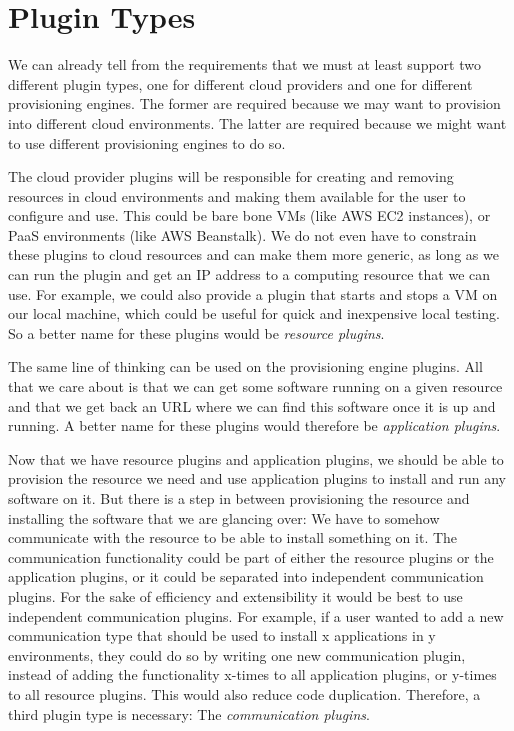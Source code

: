 \section{Plugin Types}
\label{design:plugins}

We can already tell from the requirements that we must at least support two different plugin types, one for different cloud providers and one for different provisioning engines.
The former are required because we may want to provision into different cloud environments.
The latter are required because we might want to use different provisioning engines to do so.

The cloud provider plugins will be responsible for creating and removing resources in cloud environments and making them available for the user to configure and use.
This could be bare bone VMs (like AWS EC2 instances), or PaaS environments (like AWS Beanstalk).
We do not even have to constrain these plugins to cloud resources and can make them more generic, as long as we can run the plugin and get an IP address to a computing resource that we can use.
For example, we could also provide a plugin that starts and stops a VM on our local machine, which could be useful for quick and inexpensive local testing.
So a better name for these plugins would be \textit{resource plugins}.

The same line of thinking can be used on the provisioning engine plugins.
All that we care about is that we can get some software running on a given resource and that we get back an URL where we can find this software once it is up and running.
A better name for these plugins would therefore be \textit{application plugins}.

Now that we have resource plugins and application plugins, we should be able to provision the resource we need and use application plugins to install and run any software on it.
But there is a step in between provisioning the resource and installing the software that we are glancing over: We have to somehow communicate with the resource to be able to install something on it.
The communication functionality could be part of either the resource plugins or the application plugins, or it could be separated into independent communication plugins.
For the sake of efficiency and extensibility it would be best to use independent communication plugins.
For example, if a user wanted to add a new communication type that should be used to install x applications in y environments, they could do so by writing one new communication plugin, instead of adding the functionality x-times to all application plugins, or y-times to all resource plugins.
This would also reduce code duplication.
Therefore, a third plugin type is necessary: The \textit{communication plugins}.

